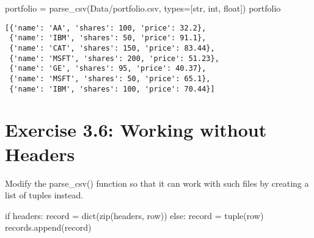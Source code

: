 \documentclass[
  letterpaper,
  DIV=11,
  numbers=noendperiod]{scrreprt}
\newenvironment{Shaded}{\begin{snugshade}}{\end{snugshade}}
\newcommand{\BuiltInTok}[1]{\textcolor[rgb]{0.00,0.46,0.62}{#1}}
\newcommand{\ControlFlowTok}[1]{\textcolor[rgb]{0.00,0.46,0.62}{#1}}
\newcommand{\NormalTok}[1]{\textcolor[rgb]{0.00,0.46,0.62}{#1}}
\newcommand{\OperatorTok}[1]{\textcolor[rgb]{0.37,0.37,0.37}{#1}}
\newcommand{\StringTok}[1]{\textcolor[rgb]{0.13,0.47,0.30}{#1}}
\begin{document}
\begin{Shaded}
\begin{Highlighting}[]
\NormalTok{portfolio }\OperatorTok{=}\NormalTok{ parse\_csv(}\StringTok{\textquotesingle{}Data/portfolio.csv\textquotesingle{}}\NormalTok{, types}\OperatorTok{=}\NormalTok{[}\BuiltInTok{str}\NormalTok{, }\BuiltInTok{int}\NormalTok{, }\BuiltInTok{float}\NormalTok{])}
\NormalTok{portfolio}
\end{Highlighting}
\end{Shaded}

\begin{verbatim}
[{'name': 'AA', 'shares': 100, 'price': 32.2},
 {'name': 'IBM', 'shares': 50, 'price': 91.1},
 {'name': 'CAT', 'shares': 150, 'price': 83.44},
 {'name': 'MSFT', 'shares': 200, 'price': 51.23},
 {'name': 'GE', 'shares': 95, 'price': 40.37},
 {'name': 'MSFT', 'shares': 50, 'price': 65.1},
 {'name': 'IBM', 'shares': 100, 'price': 70.44}]
\end{verbatim}

\hypertarget{exercise-3.6-working-without-headers}{%
\section{Exercise 3.6: Working without
Headers}\label{exercise-3.6-working-without-headers}}

Modify the parse\_csv() function so that it can work with such files by
creating a list of tuples instead.

\begin{Shaded}
\begin{Highlighting}[]
    \ControlFlowTok{if}\NormalTok{ headers:}
\NormalTok{        record }\OperatorTok{=} \BuiltInTok{dict}\NormalTok{(}\BuiltInTok{zip}\NormalTok{(headers, row))}
    \ControlFlowTok{else}\NormalTok{:}
\NormalTok{        record }\OperatorTok{=} \BuiltInTok{tuple}\NormalTok{(row)}
\NormalTok{        records.append(record)}
\end{Highlighting}
\end{Shaded}
\end{document}
